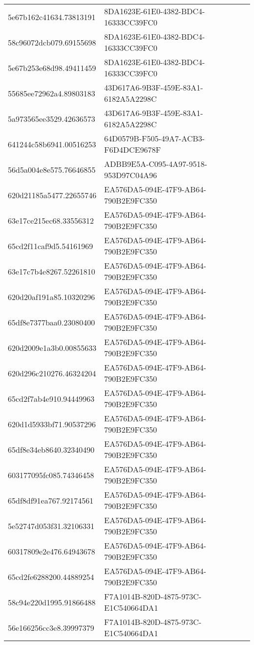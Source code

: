 \begin{tabular}{ll}
5e67b162c41634.73813191 & 8DA1623E-61E0-4382-BDC4-16333CC39FC0 \\
58c96072dcb079.69155698 & 8DA1623E-61E0-4382-BDC4-16333CC39FC0 \\
5e67b253e68d98.49411459 & 8DA1623E-61E0-4382-BDC4-16333CC39FC0 \\
55685ee72962a4.89803183 & 43D617A6-9B3F-459E-83A1-6182A5A2298C \\
5a973565ee3529.42636573 & 43D617A6-9B3F-459E-83A1-6182A5A2298C \\
641244c58b6941.00516253 & 64D0579B-F505-49A7-ACB3-F6D4DCE9678F \\
56d5a004e8e575.76646855 & ADBB9E5A-C095-4A97-9518-953D97C04A96 \\
620d21185a5477.22655746 & EA576DA5-094E-47F9-AB64-790B2E9FC350 \\
63e17ce215ec68.33556312 & EA576DA5-094E-47F9-AB64-790B2E9FC350 \\
65cd2f11caf9d5.54161969 & EA576DA5-094E-47F9-AB64-790B2E9FC350 \\
63e17c7b4e8267.52261810 & EA576DA5-094E-47F9-AB64-790B2E9FC350 \\
620d20af191a85.10320296 & EA576DA5-094E-47F9-AB64-790B2E9FC350 \\
65df8e7377baa0.23080400 & EA576DA5-094E-47F9-AB64-790B2E9FC350 \\
620d2009e1a3b0.00855633 & EA576DA5-094E-47F9-AB64-790B2E9FC350 \\
620d296c210276.46324204 & EA576DA5-094E-47F9-AB64-790B2E9FC350 \\
65cd2f7ab4e910.94449963 & EA576DA5-094E-47F9-AB64-790B2E9FC350 \\
620d1d5933bf71.90537296 & EA576DA5-094E-47F9-AB64-790B2E9FC350 \\
65df8e34eb8640.32340490 & EA576DA5-094E-47F9-AB64-790B2E9FC350 \\
603177095fc085.74346458 & EA576DA5-094E-47F9-AB64-790B2E9FC350 \\
65df8df91ea767.92174561 & EA576DA5-094E-47F9-AB64-790B2E9FC350 \\
5e52747d053f31.32106331 & EA576DA5-094E-47F9-AB64-790B2E9FC350 \\
60317809e2e476.64943678 & EA576DA5-094E-47F9-AB64-790B2E9FC350 \\
65cd2fe6288200.44889254 & EA576DA5-094E-47F9-AB64-790B2E9FC350 \\
58c94e220d1995.91866488 & F7A1014B-820D-4875-973C-E1C540664DA1 \\
56e166256cc3e8.39997379 & F7A1014B-820D-4875-973C-E1C540664DA1 \\

\end{tabular}
